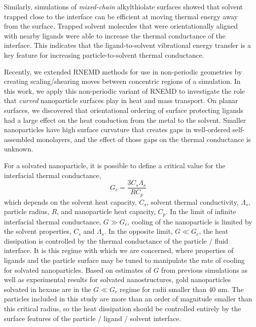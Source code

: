 \documentclass[aps,jcp,preprint,showpacs,superscriptaddress,groupedaddress]{revtex4-1}  %
\begin{document}
Similarly, simulations of {\it mixed-chain} alkylthiolate surfaces
showed that solvent trapped close to the interface can be efficient at
moving thermal energy away from the surface.\cite{Stocker:2013cl}
Trapped solvent molecules that were orientationally aligned with
nearby ligands were able to increase the thermal conductance of the
interface.  This indicates that the ligand-to-solvent vibrational
energy transfer is a key feature for increasing particle-to-solvent
thermal conductance.

Recently, we extended RNEMD methods for use in non-periodic geometries
by creating scaling/shearing moves between concentric regions of a
simulation.\cite{Stocker:2014qq} In this work, we apply this
non-periodic variant of RNEMD to investigate the role that {\it
  curved} nanoparticle surfaces play in heat and mass transport.  On
planar surfaces, we discovered that orientational ordering of surface
protecting ligands had a large effect on the heat conduction from the
metal to the solvent.  Smaller nanoparticles have high surface
curvature that creates gaps in well-ordered self-assembled monolayers,
and the effect of those gaps on the thermal conductance is unknown.


For a solvated nanoparticle, it is possible to define a critical value
for the interfacial thermal conductance,
\begin{equation}
G_c = \frac{3 C_s \Lambda_s}{R C_p}
\end{equation}
which depends on the solvent heat capacity, $C_s$, solvent thermal
conductivity, $\Lambda_s$, particle radius, $R$, and nanoparticle heat
capacity, $C_p$.\cite{Wilson:2002uq} In the limit of infinite
interfacial thermal conductance, $G \gg G_c$, cooling of the
nanoparticle is limited by the solvent properties, $C_s$ and
$\Lambda_s$.  In the opposite limit, $G \ll G_c$, the heat dissipation
is controlled by the thermal conductance of the particle / fluid
interface. It is this regime with which we are concerned, where
properties of ligands and the particle surface may be tuned to
manipulate the rate of cooling for solvated nanoparticles.  Based on
estimates of $G$ from previous simulations as well as experimental
results for solvated nanostructures, gold nanoparticles solvated in
hexane are in the $G \ll G_c$ regime for radii smaller than 40 nm. The
particles included in this study are more than an order of magnitude
smaller than this critical radius, so the heat dissipation should be
controlled entirely by the surface features of the particle / ligand /
solvent interface.
\end{document}
